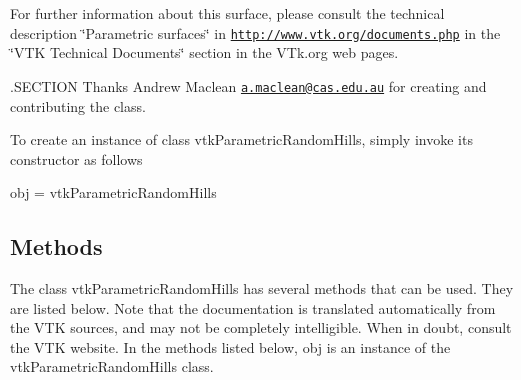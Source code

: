For further information about this surface, please consult the technical description \char`\"{}\-Parametric surfaces\char`\"{} in \href{http://www.vtk.org/documents.php}{\tt http\-://www.\-vtk.\-org/documents.\-php} in the \char`\"{}\-V\-T\-K Technical Documents\char`\"{} section in the V\-Tk.\-org web pages.

.S\-E\-C\-T\-I\-O\-N Thanks Andrew Maclean \href{mailto:a.maclean@cas.edu.au}{\tt a.\-maclean@cas.\-edu.\-au} for creating and contributing the class.

To create an instance of class vtk\-Parametric\-Random\-Hills, simply invoke its constructor as follows \begin{DoxyVerb}  obj = vtkParametricRandomHills
\end{DoxyVerb}
 \hypertarget{vtkwidgets_vtkxyplotwidget_Methods}{}\subsection{Methods}\label{vtkwidgets_vtkxyplotwidget_Methods}
The class vtk\-Parametric\-Random\-Hills has several methods that can be used. They are listed below. Note that the documentation is translated automatically from the V\-T\-K sources, and may not be completely intelligible. When in doubt, consult the V\-T\-K website. In the methods listed below, {\ttfamily obj} is an instance of the vtk\-Parametric\-Random\-Hills class. 
